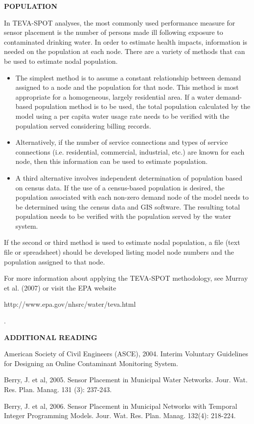 {\bf POPULATION} 

In TEVA-SPOT analyses, the most commonly used performance measure for sensor placement is the number of persons made ill following exposure to contaminated drinking water. In order to estimate health impacts, information is needed on the population at each node. There are a variety of methods that can be used to estimate nodal population. 
\begin{itemize} 
\item The simplest method is to assume a constant relationship between demand assigned to a node and the population for that node. This method is most appropriate for a homogeneous, largely residential area. If a water demand-based population method is to be used, the total population calculated by the model using a per capita water usage rate needs to be verified with the population served considering billing records.
\item Alternatively, if the number of service connections and types of service connections (i.e. residential, commercial, industrial, etc.) are known for each node, then this information can be used to estimate population. 
\item A third alternative involves independent determination of population based on census data. If the use of a census-based population is desired, the population associated with each non-zero demand node of the model needs to be determined using the census data and GIS software.   The resulting total population needs to be verified with the population served by the water system. 
\end{itemize} 
If the second or third method is used to estimate nodal population, a file (text file or spreadsheet) should be developed listing model node numbers and the population assigned to that node.  

For more information about applying the TEVA-SPOT methodology, see Murray et al. (2007) or visit the EPA website \begin{verb} http://www.epa.gov/nhsrc/water/teva.html \end{verb}.

{\bf ADDITIONAL READING}

American Society of Civil Engineers (ASCE), 2004. Interim Voluntary Guidelines for Designing an Online Contaminant Monitoring System.

Berry, J. et al, 2005. Sensor Placement in Municipal Water Networks. Jour. Wat. Res. Plan. Manag. 131 (3): 237-243.

Berry, J. et al, 2006. Sensor Placement in Municipal Networks with Temporal Integer Programming Models. Jour. Wat. Res. Plan. Manag. 132(4): 218-224. 

